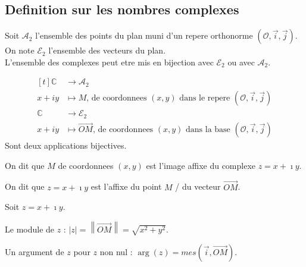 \documentclass[12pt,twoside,a4paper]{article}
\begin{document}
		\subsection{Definition sur les nombres complexes}
			\begin{defi}
				Soit $\mathcal{A}_2$ l'ensemble des points du plan muni d'un repere orthonorme $\left(\mathcal{O}, \vec{i}, \vec{j}\right)$.\\
				On note $\mathcal{E}_2$ l'ensemble des vecteurs du plan.\\
				L'ensemble des complexes peut etre mis en bijection avec $\mathcal{E}_2$ ou avec $\mathcal{A}_2$.
			\end{defi}
			\begin{preuve}
				$$ \begin{aligned}[t]
					\mathbb{C} &\longrightarrow \mathcal{A}_2 \\
					x+iy &\longmapsto M\text{, de coordonnees $\left(x, y\right)$ dans le repere $\left(\mathcal{O}, \vec{i}, \vec{j}\right)$} \\
					\mathbb{C} &\longrightarrow \mathcal{E}_2 \\
					x+iy &\longmapsto \vec{OM}\text{, de coordonnees $\left(x, y\right)$ dans la base $\left(\mathcal{O}, \vec{i}, \vec{j}\right)$}
				\end{aligned} $$
				Sont deux applications bijectives.
			\end{preuve}
			\begin{defi}
				\begin{liste}
					\item On dit que $M$ de coordonnees $\left(x, y\right)$ est l'image affixe du complexe $z=x+\imath y$.
					\item On dit que $z=x+\imath y$ est l'affixe du point $M$ / du vecteur $\vec{OM}$.
				\end{liste}
			\end{defi}
			\begin{defi}
				Soit $z=x+\imath y$.
				\begin{liste}
					\item Le module de $z$ : $|z|=\left\|\vec{OM}\right\|=\sqrt{x^2+y^2}$.
					\item Un argument de $z$ pour $z$ non nul : $\arg\left(z\right)=mes\left(\vec{i}, \vec{OM}\right)$.
				\end{liste}
			\end{defi}
\end{document}
